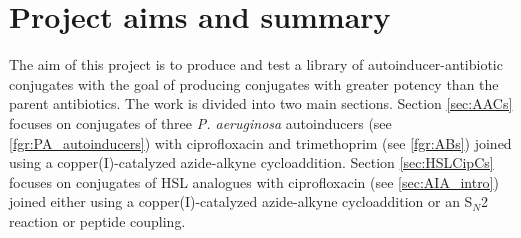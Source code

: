 \section{Project aims and summary}

The aim of this project is to produce and test a library of autoinducer-antibiotic conjugates with the goal of producing conjugates with greater potency than the parent antibiotics.
The work is divided into two main sections. Section \ref{sec:AACs} focuses on conjugates of three \textit{P. aeruginosa} autoinducers (see \ref{fgr:PA_autoinducers}) with ciprofloxacin and trimethoprim (see \ref{fgr:ABs}) joined using a copper(I)-catalyzed azide-alkyne cycloaddition.
Section \ref{sec:HSLCipCs} focuses on conjugates of HSL analogues with ciprofloxacin (see \ref{sec:AIA_intro}) joined either using a copper(I)-catalyzed azide-alkyne cycloaddition or an S$_N$2 reaction or peptide coupling.








